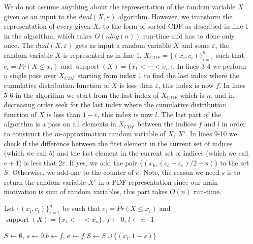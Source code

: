 \documentclass[letterpaper]{article} %
\DeclareMathOperator{\supp}{support}
\begin{document}
We do not assume anything about the representation of the random variable $X$ given as an input to the $dual(X,\varepsilon)$ algorithm. However, we transform the representation of every given $X$, to the form of sorted CDF as described in line 1 in the algorithm, which takes $O(nlog(n))$ run-time and has to done only once. The $dual(X,\varepsilon)$ gets as input a random variable $X$ and some $\varepsilon$, the random variable $X$ is represented as in line 1, $X_{CDF} =\{(x_i, c_i)\}_{i=1}^n$ such that $c_i = Pr(X \leq x_i)$ and $\supp(X)=\{x_1 <\cdots < x_n\}$. In lines 3-4 we perform a single pass over $X_{CDF}$ starting from index 1 to find the last index where the cumulative distribution function of $X$ is less than $\varepsilon$, this index is now $f$. In lines 5-6 in the algorithm we start from the last index of $X_{CDF}$ which is $n$, and in decreasing order seek for the last index where the cumulative distribution function of $X$ is less than $1-\varepsilon$, this index is now $l$. The last part of the algorithm is a pass on all elements in $X_{CDF}$ between the indices $f$ and $l$ in order to construct the $m$-approximation random variable of $X$, $X'$. In lines 9-10 we check if the difference between the first element in the current set of indices (which we call $b$) and the last element in the current set of indices (which we call $e+1$) is less that $2\varepsilon$. If yes, we add the pair $\{(x_{b}, (c_b+c_e)/2 - s) \}$ to the set $S$. Otherwise, we add one to the counter of $e$. Note, the reason we need $s$ is to return the random variable $X'$ in a PDF representation since our main motivation is sum of random variables, this part takes $O(n)$ run-time.



\begin{algorithm}
	\DontPrintSemicolon
	Let $\{(x_i, c_i)\}_{i=1}^n$ be such that $c_i = Pr(X \leq x_i)$ and $\supp(X)=\{x_1 <\cdots < x_n\}$.\;
    $f \gets 0$, $l \gets n$+1\; 


	$S \gets \emptyset$, $s \gets 0$,$b \gets f$, $e \gets f$\;
	$S \gets S \cup \{(x_{l}, 1 - s) \}$\;
    	
    	
	
	\caption{$dual(X,\varepsilon)$}   
	\label{alg:dual}
\end{algorithm}
\end{document}
